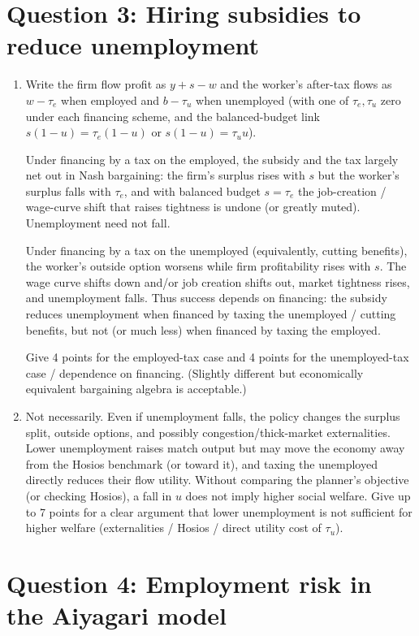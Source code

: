 \documentclass[11pt]{article}
\newcommand{\ben}{\begin{enumerate}}
\newcommand{\een}{\end{enumerate}}
\begin{document}
\section*{Question 3: Hiring subsidies to reduce unemployment}

\ben
\item Write the firm flow profit as $y+s-w$ and the worker's after-tax flows as $w-\tau_e$ when employed and $b-\tau_u$ when unemployed (with one of $\tau_e,\tau_u$ zero under each financing scheme, and the balanced-budget link $s(1-u)=\tau_e(1-u)$ or $s(1-u)=\tau_u u$).

Under financing by a tax on the employed, the subsidy and the tax largely net out in Nash bargaining: the firm's surplus rises with $s$ but the worker's surplus falls with $\tau_e$, and with balanced budget $s=\tau_e$ the job-creation / wage-curve shift that raises tightness is undone (or greatly muted). Unemployment need not fall.

Under financing by a tax on the unemployed (equivalently, cutting benefits), the worker's outside option worsens while firm profitability rises with $s$. The wage curve shifts down and/or job creation shifts out, market tightness rises, and unemployment falls. Thus success depends on financing: the subsidy reduces unemployment when financed by taxing the unemployed / cutting benefits, but not (or much less) when financed by taxing the employed.

Give 4 points for the employed-tax case and 4 points for the unemployed-tax case / dependence on financing. (Slightly different but economically equivalent bargaining algebra is acceptable.)

\item Not necessarily. Even if unemployment falls, the policy changes the surplus split, outside options, and possibly congestion/thick-market externalities. Lower unemployment raises match output but may move the economy away from the Hosios benchmark (or toward it), and taxing the unemployed directly reduces their flow utility. Without comparing the planner's objective (or checking Hosios), a fall in $u$ does not imply higher social welfare. Give up to 7 points for a clear argument that lower unemployment is not sufficient for higher welfare (externalities / Hosios / direct utility cost of $\tau_u$).
\een


\section*{Question 4: Employment risk in the Aiyagari model}
\end{document}
